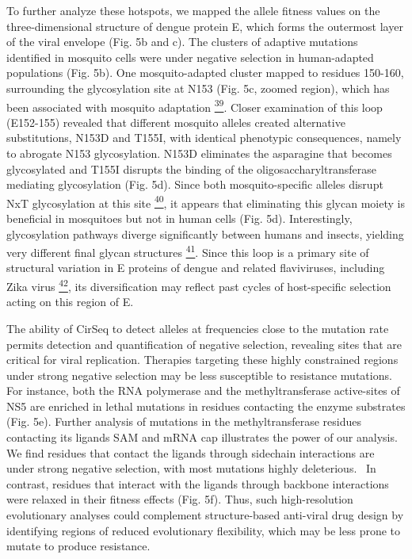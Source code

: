 \documentclass[
]{article}
\begin{document}
To further analyze these hotspots, we mapped the allele fitness values
on the three-dimensional structure of dengue protein E, which forms the
outermost layer of the viral envelope (Fig. 5b and c). The clusters of
adaptive mutations identified in mosquito cells were under negative
selection in human-adapted populations (Fig. 5b). One mosquito-adapted
cluster mapped to residues 150-160, surrounding the glycosylation site
at N153 (Fig. 5c, zoomed region), which has been associated with
mosquito adaptation
\href{https://paperpile.com/c/REZjPf/hSNe}{\textsuperscript{39}}. Closer
examination of this loop (E152-155) revealed that different mosquito
alleles created alternative substitutions, N153D and T155I, with
identical phenotypic consequences, namely to abrogate N153
glycosylation. N153D eliminates the asparagine that becomes glycosylated
and T155I disrupts the binding of the oligosaccharyltransferase
mediating glycosylation (Fig. 5d). Since both mosquito-specific alleles
disrupt NxT glycosylation at this site
\href{https://paperpile.com/c/REZjPf/gTFia}{\textsuperscript{40}}, it
appears that eliminating this glycan moiety is beneficial in mosquitoes
but not in human cells (Fig. 5d). Interestingly, glycosylation pathways
diverge significantly between humans and insects, yielding very
different final glycan structures
\href{https://paperpile.com/c/REZjPf/JUNqO}{\textsuperscript{41}}. Since
this loop is a primary site of structural variation in E proteins of
dengue and related flaviviruses, including Zika virus
\href{https://paperpile.com/c/REZjPf/hrhvV}{\textsuperscript{42}}, its
diversification may reflect past cycles of host-specific selection
acting on this region of E.

The ability of CirSeq to detect alleles at frequencies close to the
mutation rate permits detection and quantification of negative
selection, revealing sites that are critical for viral replication.
Therapies targeting these highly constrained regions under strong
negative selection may be less susceptible to resistance mutations. For
instance, both the RNA polymerase and the methyltransferase active-sites
of NS5 are enriched in lethal mutations in residues contacting the
enzyme substrates (Fig. 5e). Further analysis of mutations in the
methyltransferase residues contacting its ligands SAM and mRNA cap
illustrates the power of our analysis. We find residues that contact the
ligands through sidechain interactions are under strong negative
selection, with most mutations highly deleterious.~ In contrast,
residues that interact with the ligands through backbone interactions
were relaxed in their fitness effects (Fig. 5f). Thus, such
high-resolution evolutionary analyses could complement structure-based
anti-viral drug design by identifying regions of reduced evolutionary
flexibility, which may be less prone to mutate to produce resistance.
\end{document}
